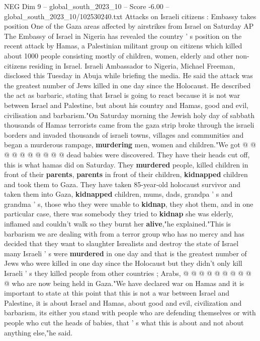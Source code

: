 \begin{textsample}{NEG Dim 9 – global\_south\_2023\_10 – Score -6.00 – global\_south\_2023\_10/102530240.txt}  \label{ex:f9_neg_362}
Attacks on Israeli citizens : Embassy takes position One of the Gaza areas affected by airstrikes from Israel on Saturday AP The Embassy of Israel in Nigeria has revealed the country ' s position on the recent attack by Hamas, a Palestinian militant group on citizens which killed about 1000 people consisting mostly of children, women, elderly and other non-citizens residing in Israel.
Israeli Ambassador to Nigeria, Michael Freeman, disclosed this Tuesday in Abuja while briefing the media.
He said the attack was the greatest number of Jews killed in one day since the Holocaust.
He described the act as barbaric, stating that Israel is going to react because it is not war between Israel and Palestine, but about his country and Hamas, good and evil, civilisation and barbarism."On Saturday morning the Jewish holy day of sabbath thousands of Hamas terrorists came from the gaza strip broke through the israeli borders and invaded thousands of israeli towns, villages and communities and began a murderous rampage, \textbf{murdering} men, women and children."We got @ @ @ @ @ @ @ @ @ @ dead babies were discovered.
They have their heads cut off, this is what hamas did on Saturday.
They \textbf{murdered} people, killed children in front of their \textbf{parents}, \textbf{parents} in front of their children, \textbf{kidnapped} children and took them to Gaza.
They have taken 85-year-old holocaust survivor and taken them into Gaza, \textbf{kidnapped} children, mums, dads, grandpa ' s and grandma ' s, those who they were unable to \textbf{kidnap}, they shot them, and in one particular case, there was somebody they tried to \textbf{kidnap} she was elderly, inflamed and couldn't walk so they burnt her \textbf{alive},"he explained."This is barbarism we are dealing with from a terror group who has no mercy and has decided that they want to slaughter Isrealists and destroy the state of Israel many Israeli ' s were \textbf{murdered} in one day and that is the greatest number of Jews who were killed in one day since the Holocaust but they didn't only kill Israeli ' s they killed people from other countries ; Arabs, @ @ @ @ @ @ @ @ @ @ who are now being held in Gaza."We have declared war on Hamas and it is important to state at this point that this is not a war between Israel and Palestine, it is about Israel and Hamas, about good and evil, civilization and barbarism, its either you stand with people who are defending themselves or with people who cut the heads of babies, that ' s what this is about and not about anything else,"he said.

\end{textsample}
